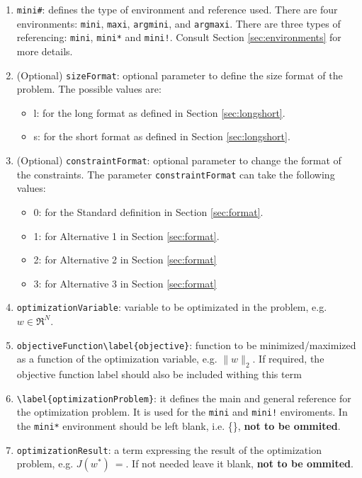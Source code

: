 \documentclass[a4paper]{article}
\begin{document}
\begin{enumerate}[label=(\roman*)]
	\item \verb|mini#|: defines the type of environment and reference used. There are four environments: \verb|mini|, \verb|maxi|, \verb|argmini|, and \verb|argmaxi|. There are three types of referencing: \verb|mini|, \verb|mini*| and \verb|mini!|. Consult Section \ref{sec:environments} for more details. 
	\item (Optional) \verb|sizeFormat|: optional parameter to define the size format of the problem. The possible values are:
	\begin{itemize}
		\item l: for the long format as defined in Section \ref{sec:longshort}.
		\item s: for the short format as defined in Section \ref{sec:longshort}.
	\end{itemize}	
	\item (Optional) \verb|constraintFormat|: optional parameter to change the format of the constraints. The parameter \verb|constraintFormat| can take the following values: 
	\begin{itemize}
	\item 0: for the Standard definition in Section \ref{sec:format}.
	\item 1: for Alternative 1 in Section \ref{sec:format}.
	\item 2: for Alternative 2 in Section \ref{sec:format}
	\item 3: for Alternative 3 in Section \ref{sec:format}		
	\end{itemize}
	\item \verb|optimizationVariable|: variable to be optimizated in the problem, e.g. $w \in \Re^N$.
	\item \verb|objectiveFunction\label{objective}|: function to be minimized/maximized as a function of the optimization variable, e.g. $\|w\|_2$. If required, the objective function label should also be included withing this term
	\item \verb|\label{optimizationProblem}|: it defines the main and general reference for the optimization problem. It is used for the \verb|mini| and \verb|mini!| enviroments. In the \verb|mini*| environment should be left blank, i.e. \{\}, \textbf{not to be ommited}.
	\item \verb|optimizationResult|: a term expressing the result of the optimization problem, e.g. $J(w^*)~=$. If not needed leave it blank, \textbf{not to be ommited}.
\end{enumerate}
\end{document}
